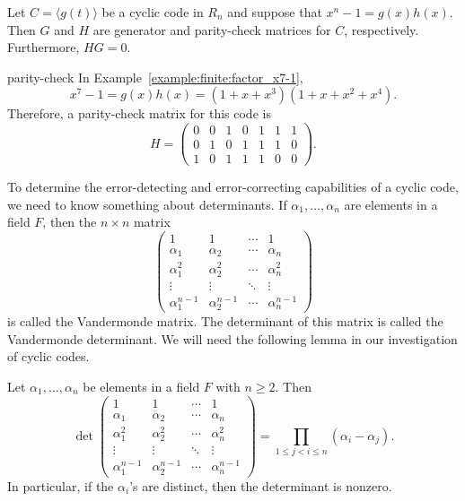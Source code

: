 \begin{proposition}
Let $C = \langle g(t) \rangle$ be a cyclic code in $R_n$ and suppose that $x^n - 1 = g(x) h(x)$.  Then $G$ and $H$ are generator and parity-check matrices  for $C$, respectively.  Furthermore, $HG = 0$. 
\end{proposition}


\begin{example}{parity-check}
In Example~\ref{example:finite:factor_x7-1},
\[
x^7 - 1 = g(x) h(x) = (1 + x + x^3)(1 + x + x^2 + x^4).
\]
Therefore, a parity-check matrix for this code is
\[
H =
\begin{pmatrix}
0 & 0 & 1 & 0 & 1 & 1 & 1 \\
0 & 1 & 0 & 1 & 1 & 1 & 0 \\
1 & 0 & 1 & 1 & 1 & 0 & 0
\end{pmatrix}.
\]
\end{example}


To determine the error-detecting and error-correcting capabilities of a cyclic code, we need to know something about determinants.  If $\alpha_1, \ldots, \alpha_n$ are elements in a field $F$, then the $n 
\times n$ matrix  
\[
\begin{pmatrix}
1          & 1          & \cdots & 1 \\
\alpha_1   & \alpha_2   & \cdots & \alpha_n \\
\alpha_1^2 & \alpha_2^2 & \cdots & \alpha_n^2 \\
\vdots     & \vdots     & \ddots & \vdots \\
\alpha_1^{n-1} & \alpha_2^{n-1} & \cdots & \alpha_n^{n-1} 
\end{pmatrix}
\]
is called the {\bfi Vandermonde matrix}.  The
determinant of this matrix is called the {\bfi Vandermonde determinant}.  We will need the following lemma in our investigation of cyclic codes.

\begin{lemma}\label{finite:V_det_lemma}
Let $\alpha_1, \ldots, \alpha_n$ be elements in a field $F$ with $n \geq 2$.  Then
\[
\det
\begin{pmatrix}
1              & 1              & \cdots & 1 \\
\alpha_1       & \alpha_2       & \cdots & \alpha_n \\
\alpha_1^2     & \alpha_2^2     & \cdots & \alpha_n^2 \\
\vdots         & \vdots         & \ddots & \vdots \\
\alpha_1^{n-1} & \alpha_2^{n-1} & \cdots & \alpha_n^{n-1} 
\end{pmatrix}
= 
\prod_{1 \leq j < i \leq n} (\alpha_i - \alpha_j).
\]
In particular, if the $\alpha_i$'s are distinct, then the determinant is nonzero.
\end{lemma}



